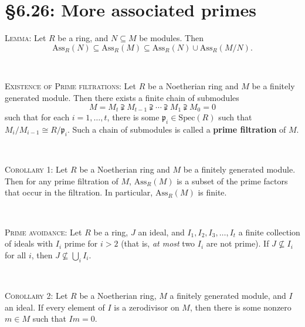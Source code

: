 \documentclass[12pt]{amsart}
\newcommand{\p}{\mathfrak{p}}
\newcommand{\Spec}{\mathrm{Spec}}
\newcommand{\Ass}{\mathrm{Ass}}
\renewcommand{\1}{\mathbbm{1}}
\newcommand{\showsol}[1]{\def\displaysol{#1}}
\begin{document}
\showsol{0}
	
	\thispagestyle{empty}
	
	\section*{\S6.26: More associated primes}
	
	\begin{framed}

\noindent \textsc{Lemma:} Let $R$ be a ring, and $N\subseteq M$ be modules. Then
\[ \Ass_R(N) \subseteq \Ass_R(M) \subseteq \Ass_R(N) \cup \Ass_R(M/N).\]

\

\noindent \textsc{Existence of Prime filtrations:} Let $R$ be a Noetherian ring and $M$ be a finitely generated module. Then there exists a finite chain of submodules
\[ M= M_t \supsetneqq M_{t-1} \supsetneqq \cdots \supsetneqq M_{1} \supsetneqq M_0 = 0 \]
such that for each $i=1,\dots,t$, there is some $\p_i\in \Spec(R)$ such that $M_i / M_{i-1} \cong R/\p_i$.
Such a chain of submodules is called a \textbf{prime filtration} of $M$.

\

\noindent \textsc{Corollary 1:} Let $R$ be a Noetherian ring and $M$ be a finitely generated module. Then for any prime filtration of $M$, $\Ass_R(M)$ is a subset of the prime factors that occur in the filtration. In particular, $\Ass_R(M)$ is finite.

\

\noindent \textsc{Prime avoidance:} Let $R$ be a ring, $J$ an ideal, and $I_1,I_2,I_3,\dots,I_t$ a finite collection of ideals with $I_i$ prime for $i>2$ (that is, \emph{at most} two $I_i$ are not prime). If $J\not\subseteq I_i$ for all $i$, then $J \not\subseteq \bigcup_i I_i$.

\

\noindent \textsc{Corollary 2:} Let $R$ be a Noetherian ring, $M$ a finitely generated module, and $I$ an ideal. If every element of $I$ is a zerodivisor on $M$, then there is some nonzero $m\in M$ such that $Im=0$.

\end{framed}


	
\end{document}
